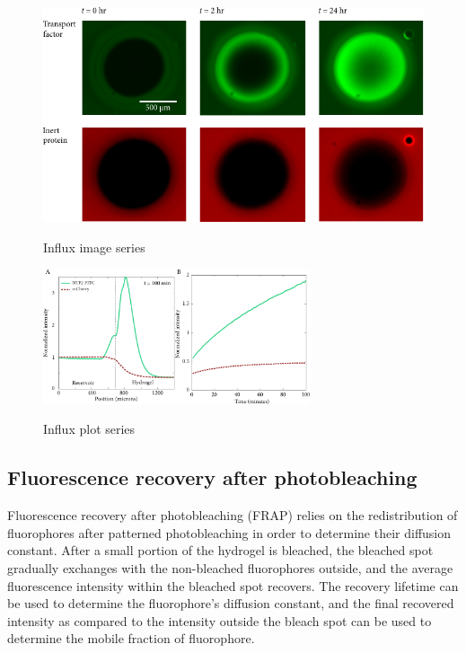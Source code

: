 \begin{figure}
\caption{Influx image series}
\centering
\includegraphics[width=\textwidth]{figs/ch04/influx-images-clean.pdf}
\label{fig:influx-images}
\end{figure} 

\begin{figure}
\caption{Influx plot series \\}
\centering
\includegraphics[width=0.7\textwidth]{figs/ch04/influx-plots.pdf}
\label{fig:influx-plots}
\end{figure} 

\subsection{Fluorescence recovery after photobleaching}
Fluorescence recovery after photobleaching (FRAP) relies on the redistribution of fluorophores after patterned photobleaching in order to determine their diffusion constant.  After a small portion of the hydrogel is bleached, the bleached spot gradually exchanges with the non-bleached fluorophores outside, and the average fluorescence intensity within the bleached spot recovers.  The recovery lifetime can be used to determine the fluorophore's diffusion constant, and the final recovered intensity as compared to the intensity outside the bleach spot can be used to determine the mobile fraction of fluorophore.

